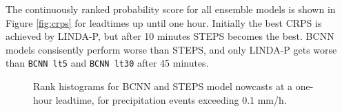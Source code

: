 The continuously ranked probability score for all ensemble models is shown in Figure \ref{fig:crps} for leadtimes up until one hour. Initially the best CRPS is achieved by LINDA-P, but after 10 minutes STEPS becomes the best. BCNN models consisently perform worse than STEPS, and only LINDA-P gets worse than \texttt{BCNN lt5} and \texttt{BCNN lt30} after 45 minutes.

\begin{figure}[H]
	\centering
	
	
	\caption{Rank histograms for BCNN and STEPS model nowcasts at a one-hour leadtime, for precipitation events exceeding 0.1 mm/h.}
	\label{fig:rh}
\end{figure}

